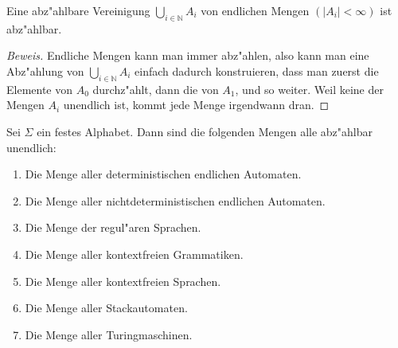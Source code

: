 \begin{satz}\label{countablefinite}
Eine abz"ahlbare Vereinigung $\bigcup_{i\in\mathbb N}A_i$ von endlichen
Mengen $(|A_i|<\infty)$ ist abz"ahlbar.
\end{satz}

\begin{proof}[Beweis]
Endliche Mengen kann man immer abz"ahlen, also kann man eine Abz"ahlung
von $\bigcup_{i\in\mathbb N}A_i$ einfach dadurch konstruieren, dass
man zuerst die Elemente von $A_0$ durchz"ahlt, dann die von $A_1$, und
so weiter. Weil keine der Mengen $A_i$ unendlich ist, kommt jede
Menge irgendwann dran.
\end{proof}

\begin{satz} Sei $\Sigma$ ein festes Alphabet. Dann sind die folgenden
Mengen alle abz"ahlbar unendlich:
\begin{enumerate}
\item Die Menge aller deterministischen endlichen Automaten.
\item Die Menge aller nichtdeterministischen endlichen Automaten.
\item Die Menge der regul"aren Sprachen.
\item Die Menge aller kontextfreien Grammatiken.
\item Die Menge aller kontextfreien Sprachen.
\item Die Menge aller Stackautomaten.
\item Die Menge aller Turingmaschinen.
\end{enumerate}
\end{satz}

